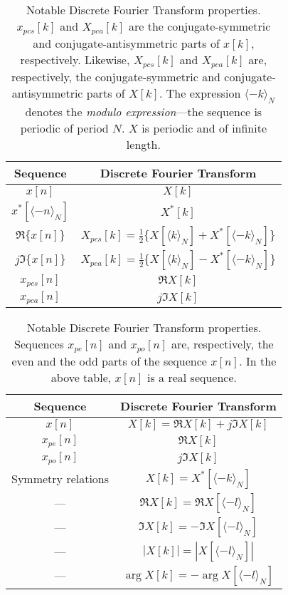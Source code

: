 \documentclass[\documentfontsize, twocolumn]{\classname}
\begin{document}
\begin{table*}[ht]
\centering
\begin{tabular}{c c}
    \hline
    \textbf{Sequence} & \textbf{Discrete Fourier Transform} \\
    \hline
    $x[n]$  & $X[k]$ \\
    \hline
    $x^*[\langle -n\rangle_N]$ & $X^*[k]$ \\
    $\Re{\{x[n]\}}$ & $X_{pcs}[k] = \frac 1 2 \{X[\langle k\rangle_N] + X^*[\langle -k \rangle_N]\}$\\
    $j\Im{\{x[n]\}}$ & $X_{pca}[k] = \frac 1 2 \{X[\langle k\rangle_N] - X^*[\langle -k\rangle_N]\}$\\
    $x_{pcs}[n]$ & $\Re{X[k]}$ \\
    $x_{pca}[n]$ & $j\Im{X[k]}$ \\
    \hline
\end{tabular}
\caption{Notable Discrete Fourier Transform properties. $x_{pcs}[k]$ and $X_{pca}[k]$ are the conjugate-symmetric and conjugate-antisymmetric parts of $x[k]$, respectively. Likewise, $X_{pcs}[k]$ and $X_{pca}[k]$ are, respectively, the conjugate-symmetric and conjugate-antisymmetric parts of $X[k]$. The expression $\langle -k \rangle_N$ denotes the \emph{modulo expression}---the sequence is periodic of period $N$. $X$ is periodic and of infinite length.}\label{tab:discreteFourierTransformPropertiesAndTheorems}
\end{table*}

\begin{table*}[ht]
\centering
\begin{tabular}{c c}
    \hline
    \textbf{Sequence} & \textbf{Discrete Fourier Transform} \\
    \hline
    $x[n]$ & $X[k] = \Re{X[k]} + j\Im{X[k]}$ \\
    \hline
    $x_{pe}[n]$ & $\Re{X[k]}$ \\
    $x_{po}[n]$ & $j\Im {X[k]}$ \\
    \hline
    Symmetry relations & $X[k] = X^*[\langle -k\rangle_N]$ \\
    --- & $\Re X[k] = \Re X[\langle -l\rangle_N]$ \\
    --- & $\Im X[k] = -\Im X[\langle -l \rangle_N]$ \\
    --- & $|X[k]| = |X[\langle -l \rangle_N]|$ \\
    --- & $\arg{X[k]} = -\arg{X[\langle -l \rangle_N]}$ \\
    \hline
\end{tabular}
\caption{Notable Discrete Fourier Transform properties. Sequences $x_{pe}[n]$ and $x_{po}[n]$ are, respectively, the even and the odd parts of the sequence $x[n]$. In the above table, $x[n]$ is a real sequence.}\label{tab:discreteFourierTransformPropertiesAndTheorems2}
\end{table*}
\end{document}
